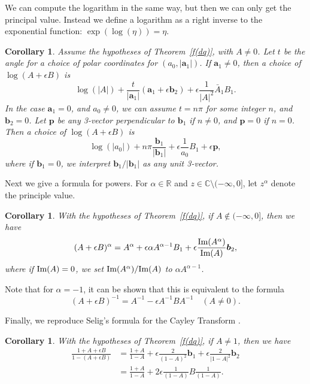 \documentclass[12pt,reqno]{amsart}
\newtheorem{cor}[theorem]{Corollary}
\begin{document}
We can compute the logarithm in the same way, but then we can only get the principal value.  Instead we define a logarithm as a right inverse to the exponential function: $\exp(\log(\eta)) = \eta$.

\begin{cor}
\label{log dq}
Assume the hypotheses of Theorem~\ref{f(dq)}, with $A \ne 0$.  Let $t$ be the angle for a choice of polar coordinates for $(a_0, |\bm a_1|)$.  If $\bm a_1 \ne 0$, then a choice of $\log(A+\epsilon B)$ is
\begin{equation}
\log(|A|) + \dfrac t{|\bm a_1|} (\bm a_1 + \epsilon \bm b_2) + \epsilon \dfrac1{|A|^2} \bar A_1 B_1 .
\end{equation}
In the case $\bm a_1 = 0$, and $a_0 \ne 0$, we can assume $t = n \pi$ for some integer $n$, and $\bm b_2 = 0$.  Let $\bm p$ be any 3-vector perpendicular to $\bm b_1$ if $n \ne 0$, and $\bm p = 0$ if $n = 0$.  Then a choice of $\log(A + \epsilon B)$ is
\begin{equation}
\label{t=n pi}
\log(|a_0|) + n \pi \dfrac{\bm b_1}{|\bm b_1|} + \epsilon \dfrac 1{a_0} B_1 + \epsilon \bm p,
\end{equation}
where if $\bm b_1 = 0$, we interpret $\bm b_1 / |\bm b_1|$ as any unit 3-vector.
\end{cor}

Next we give a formula for powers.  For $\alpha \in \mathbb R$ and $z \in \mathbb C \setminus (-\infty,0]$, let $z^\alpha$ denote the principle value.

\begin{cor}
With the hypotheses of Theorem~\ref{f(dq)}, if $A \notin (-\infty,0]$, then we have
\begin{equation}
(A + \epsilon B )^\alpha =
A^\alpha + \epsilon \alpha A^{\alpha - 1} B_1 + \epsilon \frac{\text{\rm Im}(A^\alpha)}{\text{\rm Im}(A)} \bm b_2 ,
\end{equation}
where if $\text{\rm Im}(A) = 0$, we set ${\text{\rm Im}(A^\alpha)}/{\text{\rm Im}(A)}$ to $\alpha A^{\alpha - 1} $.
\end{cor}

Note that for $\alpha = -1$, it can be shown that this is equivalent to the formula
\begin{equation}
(A + \epsilon B)^{-1} = A^{-1} - \epsilon A^{-1} B A^{-1} \quad (A \ne 0).
\end{equation}

Finally, we reproduce Selig's formula for the Cayley Transform \cite{selig}.

\begin{cor}
With the hypotheses of Theorem~\ref{f(dq)}, if $A \ne 1$, then we have
\begin{equation}
\begin{aligned}
\frac{1 + A + \epsilon B}{1 - (A + \epsilon B)}
&=
\frac{1+A}{1-A} + \epsilon \frac{2}{(1-A)^2} \bm b_1 + \epsilon \frac{2}{|1-A|^2} \bm b_2 \\
&=
\frac{1+A}{1-A} + 2 \epsilon \frac{1}{(1-A)} B \frac{1}{(1-A)} .
\end{aligned}
\end{equation}
\end{cor}
\end{document}
